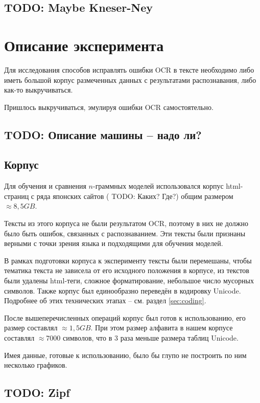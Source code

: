\documentclass[14pt,russian]{extreport}
\theoremstyle{definition}
\newcommand{\todo}[1]{}
\renewcommand{\todo}[1]{{\color{red} TODO: {#1}}}
\begin{document}
\subsection{ \todo{Maybe Kneser-Ney} }

\newpage
\section{ Описание эксперимента }\label{sec:experiment}

Для исследования способов исправлять ошибки OCR в тексте необходимо либо иметь большой корпус размеченных данных с результатами распознавания, либо как-то выкручиваться. 

Пришлось выкручиваться, эмулируя ошибки OCR самостоятельно.

\subsection{ \todo{Описание машины -- надо ли?} }

\subsection{ Корпус }

Для обучения и сравнения $n$-граммных моделей использовался корпус html-страниц с ряда японских сайтов (\todo{Каких? Где?}) общим размером $\approx 8,5 GB$. 

Тексты из этого корпуса не были результатом OCR, поэтому в них не должно было быть ошибок, связанных с распознаванием. Эти тексты были признаны верными с точки зрения языка и подходящими для обучения моделей.

В рамках подготовки корпуса к эксперименту тексты были перемешаны, чтобы тематика текста не зависела от его исходного положения в корпусе, из текстов были удалены html-теги, сложное форматирование, небольшое число мусорных символов. Также корпус был единообразно переведён в кодировку Unicode. Подробнее об этих технических этапах -- см. раздел \ref{sec:coding}.

После вышеперечисленных операций корпус был готов к использованию, его размер составлял $\approx 1,5 GB$. При этом размер алфавита в нашем корпусе составлял $\approx 7000$ символов, что в 3 раза меньше размера таблиц Unicode.

Имея данные, готовые к использованию, было бы глупо не построить по ним несколько графиков.

\subsection{ \todo{Zipf} }
\end{document}
